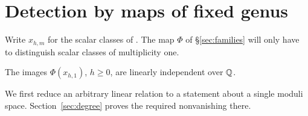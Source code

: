 \section{Detection by maps of fixed genus}\label{sec:genus}
Write $x_{h,m}$ for the scalar classes of
\cite[Definition~4.7]{Pardon}. The map $\Phi$ of \S\ref{sec:families}
will only have to distinguish scalar classes of multiplicity one.

\begin{theorem}\label{thm:independence}
The images $\Phi(x_{h,1})$, $h\ge0$, are linearly independent over $\mathbb Q$.
\end{theorem}

We first reduce an arbitrary linear relation to a statement about a
single moduli space. Section~\ref{sec:degree} proves the required
nonvanishing there.

